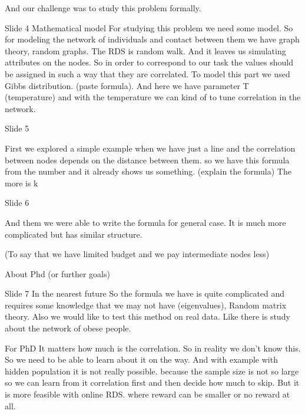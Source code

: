 \documentclass[12pt]{report}
\begin{document}
And our challenge was to study this problem formally.

Slide 4
Mathematical model
For studying this problem we need some model. So for modeling the network of individuals and contact between them we have graph theory, random graphs.
The RDS is random walk.
And it leaves us simulating attributes on the nodes. So in order to correspond to our task the values should be assigned in such a way that they are correlated. To model this part we used Gibbs distribution. (paste formula). And here we have parameter T (temperature) and with the temperature we can kind of to tune correlation in the network.

Slide 5

First we explored a simple example when we have just a line and the correlation between nodes depends on the distance between them. so we have this formula from the number and it already shows us something. (explain the formula) The more is k 

Slide 6

And them we were able to write the formula for general case. It is much more complicated but has similar structure. 



(To say that we have limited budget and we pay intermediate nodes less)

About Phd (or further goals)

Slide 7
In the nearest future
So the formula we have is quite complicated and requires some knowledge that we may not have (eigenvalues), Random matrix theory.
Also we would like to test this method on real data. Like there is study about the network of obese people.

For PhD
It matters how much is the correlation.
So in reality we don't know this. So we need to be able to learn about it on the way. And with example with hidden population it is not really possible. because the sample size is not so large so we can learn from it correlation first and then decide how much to skip. But it is more feasible with online RDS. where reward can be smaller or no reward at all.



\end{document}
